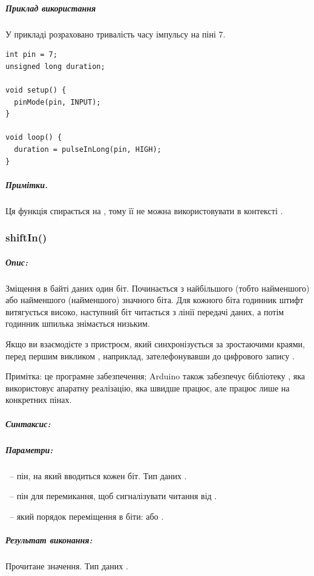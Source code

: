 \documentclass[12pt,a4paper]{report}  %
\begin{document}
\subparagraph{Приклад використання}

У прикладі розраховано тривалість часу імпульсу на піні 7.

\begin{lstlisting}[label=digitalwrite,caption=pulseInLong]
int pin = 7;
unsigned long duration;

void setup() {
  pinMode(pin, INPUT);
}

void loop() {
  duration = pulseInLong(pin, HIGH);
}
\end{lstlisting}

\subparagraph{Примітки.}

Ця функція спирається на , тому її не можна використовувати в контексті .

\subsubsection{shiftIn()}\label{shiftIn}

\subparagraph{Опис:}

Зміщення в байті даних один біт. Починається з найбільшого (тобто найменшого) або найменшого (найменшого) значного біта. Для кожного біта годинник штифт витягується високо, наступний біт читається з лінії передачі даних, а потім годинник шпилька знімається низьким.

Якщо ви взаємодієте з пристроєм, який синхронізується за зростаючими краями, перед першим викликом , наприклад, зателефонувавши до цифрового запису .

Примітка: це програмне забезпечення; Arduino також забезпечує бібліотеку , яка використовує апаратну реалізацію, яка швидше працює, але працює лише на конкретних пінах.

\subparagraph{Синтаксис:}


\subparagraph{Параметри:}

~-- пін, на який вводиться кожен біт.  Тип даних .

~-- пін для перемикання, щоб сигналізувати читання від .

~-- який порядок переміщення в біти:  або .

\subparagraph{Результат виконання:} 

Прочитане значення. Тип даних .
\end{document}
